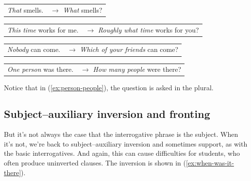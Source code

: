 \begin{exe}
    \ex
    \begin{xlist}
        \ex 
        \begin{tabular}[t]{@{}p{4.1cm}@{}p{6cm}@{}}
            \emph{That} smells. & \(\rightarrow\) \emph{What} smells?
        \end{tabular}
        
        \ex 
        \begin{tabular}[t]{@{}p{4.1cm}@{}p{6cm}@{}}
            \emph{This time} works for me. & \(\rightarrow\) \emph{Roughly what time} works for you?
        \end{tabular}
        
        \ex 
        \begin{tabular}[t]{@{}p{4.1cm}@{}p{6cm}@{}}
            \emph{Nobody} can come. & \(\rightarrow\) \emph{Which of your friends} can come?
        \end{tabular}
        
        \ex \label{ex:person-people}
        \begin{tabular}[t]{@{}p{4.1cm}@{}p{6cm}@{}}
            \emph{One person} was there. & \(\rightarrow\) \emph{How many people} were there?
        \end{tabular}
    \end{xlist}
    \label{ex:int-phr-subj}
\end{exe}

Notice that in (\ref{ex:person-people}), the question is asked in the plural.

\subsection{Subject--auxiliary inversion and fronting} \label{sec:subj-aux-inversion-and-fronting}

But it's not always the case that the interrogative phrase is the subject. When it's not, we're back to subject--auxiliary inversion and sometimes  support, as with the basic interrogatives. And again, this can cause difficulties for students, who often produce uninverted clauses. The inversion is shown in (\ref{ex:when-was-it-there}).

